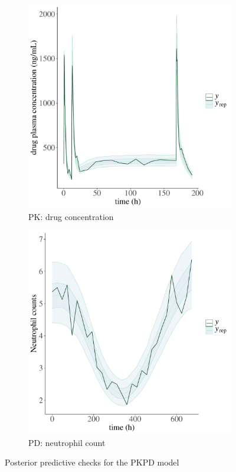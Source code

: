 \begin{figure}
  \begin{subfigure}[b]{0.45\textwidth}
    \includegraphics[width=\textwidth]{../figures/neutrophil_ppc_pk.pdf}
    \caption{PK: drug concentration}
    \label{fig:neutro_ppc_1}
  \end{subfigure}
  \qquad
  \begin{subfigure}[b]{0.45\textwidth}
    \includegraphics[width=\textwidth]{../figures/neutrophil_ppc_pd.pdf}
    \caption{PD: neutrophil count}
    \label{fig:neutro_ppc_2}
  \end{subfigure}
  \caption{Posterior predictive checks for the PKPD model}
\end{figure}
